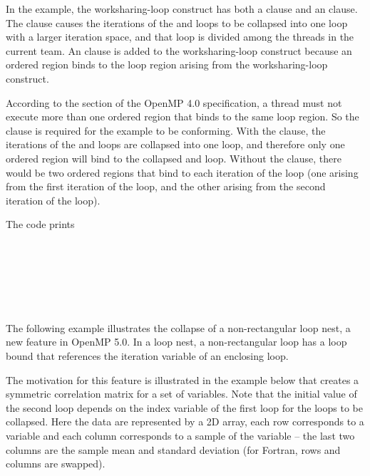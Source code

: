 In the example, the worksharing-loop construct has both a  clause and an  
clause. The  clause causes the iterations of the  and 
 loops to be collapsed into one loop with a larger iteration space, and 
that loop is divided among the threads in the current team. An  
clause is added to the worksharing-loop construct because an ordered region binds to the loop 
region arising from the worksharing-loop construct.

According to the  section of the OpenMP 4.0 specification, 
a thread must not execute more than one ordered region that binds 
to the same loop region. So the  clause is required for the example 
to be conforming. With the  clause, the iterations of the  
and  loops are collapsed into one loop, and therefore only one ordered 
region will bind to the collapsed  and  loop. Without the  
clause, there would be two ordered regions that bind to each iteration of the  
loop (one arising from the first iteration of the  loop, and the other 
arising from the second iteration of the  loop).

\pagebreak
The code prints

\\
\\
\\
\\
\\




The following example illustrates the collapse of a non-rectangular loop nest,
a new feature in OpenMP 5.0. In a loop nest, a non-rectangular loop has a
loop bound that references the iteration variable of an enclosing loop.

The motivation for this feature is illustrated
in the example below that creates a symmetric correlation matrix for a set of
variables. Note that the initial value of the second loop depends on the index
variable of the first loop for the loops to be collapsed.
Here the data are represented by a 2D array, each row corresponds to a variable
and each column corresponds to a sample of the variable -- the last two columns
are the sample mean and standard deviation (for Fortran, rows and columns are swapped).


